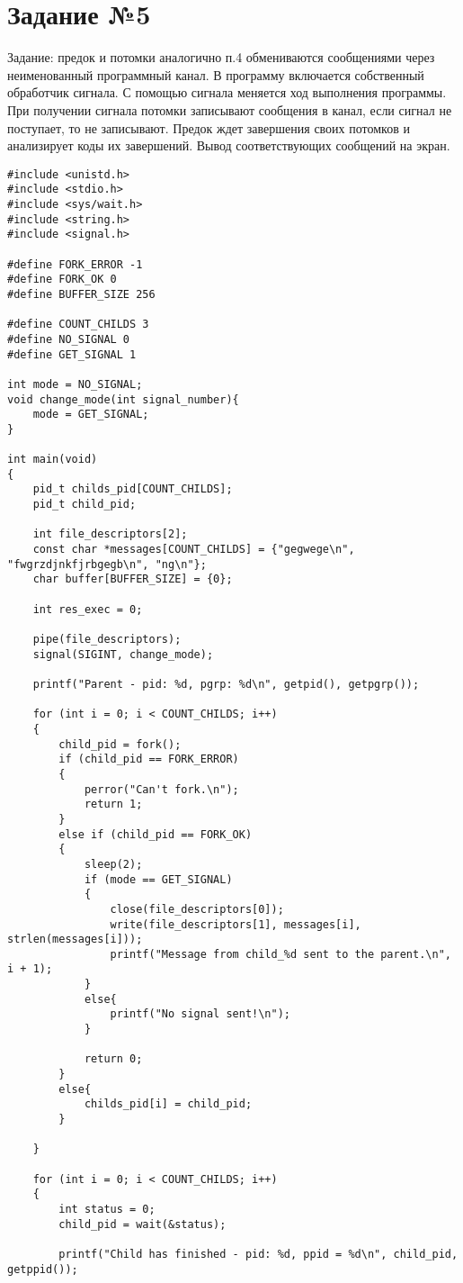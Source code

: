 \chapter*{Задание №5}
Задание: предок и потомки аналогично п.4 обмениваются сообщениями через неименованный программный канал. В программу включается собственный обработчик сигнала. С помощью сигнала меняется ход выполнения программы. При получении сигнала потомки записывают сообщения в канал, если сигнал не поступает, то не записывают. Предок ждет завершения своих потомков и анализирует коды их завершений. Вывод соответствующих сообщений на экран.

\begin{lstlisting}[label = exec, caption=Использование сигнала.]
#include <unistd.h>
#include <stdio.h>
#include <sys/wait.h>
#include <string.h>
#include <signal.h>

#define FORK_ERROR -1
#define FORK_OK 0
#define BUFFER_SIZE 256

#define COUNT_CHILDS 3
#define NO_SIGNAL 0
#define GET_SIGNAL 1

int mode = NO_SIGNAL;
void change_mode(int signal_number){
	mode = GET_SIGNAL;
}

int main(void)
{
	pid_t childs_pid[COUNT_CHILDS];
	pid_t child_pid;
	
	int file_descriptors[2];
	const char *messages[COUNT_CHILDS] = {"gegwege\n", "fwgrzdjnkfjrbgegb\n", "ng\n"};
	char buffer[BUFFER_SIZE] = {0};
	
	int res_exec = 0;
	
	pipe(file_descriptors);
	signal(SIGINT, change_mode);
	
	printf("Parent - pid: %d, pgrp: %d\n", getpid(), getpgrp());
	
	for (int i = 0; i < COUNT_CHILDS; i++)
	{
		child_pid = fork();
		if (child_pid == FORK_ERROR)
		{
			perror("Can't fork.\n");
			return 1;
		}
		else if (child_pid == FORK_OK)
		{
			sleep(2);
			if (mode == GET_SIGNAL)
			{
				close(file_descriptors[0]);
				write(file_descriptors[1], messages[i], strlen(messages[i]));
				printf("Message from child_%d sent to the parent.\n", i + 1);
			}
			else{
				printf("No signal sent!\n");
			}
			
			return 0;
		}
		else{
			childs_pid[i] = child_pid;
		}
		
	}
	
	for (int i = 0; i < COUNT_CHILDS; i++)
	{
		int status = 0;
		child_pid = wait(&status);
		
		printf("Child has finished - pid: %d, ppid = %d\n", child_pid, getppid());
		

\end{lstlisting}

